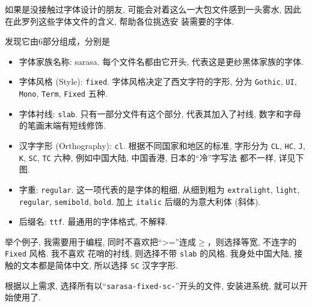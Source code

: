 \documentclass{article}
\begin{document}
如果是没接触过字体设计的朋友, 可能会对着这么一大包文件感到一头雾水, 因此在此罗列这些字体文件的含义, 帮助各位挑选安
装需要的字体.


发现它由6部分组成，分别是
\begin{itemize}
	\item 字体家族名称: sarasa. 每个文件名都由它开头, 代表这是更纱黑体家族的字体.
	\item 字体风格 (Style): \texttt{fixed}. 字体风格决定了西文字符的字形, 分为 \texttt{Gothic}, \texttt{UI}, 
	      \texttt{Mono}, \texttt{Term}, \texttt{Fixed} 五种.
	\item 字体衬线: \texttt{slab}. 只有一部分文件有这个部分, 代表其加入了衬线, 数字和字母的笔画末端有短线修饰.
	\item 汉字字形 (Orthography): \texttt{cl}. 根据不同国家和地区的标准, 字形分为 \texttt{CL}, \texttt{HC}, 
	      \texttt{J}, \texttt{K}, \texttt{SC}, \texttt{TC} 六种, 例如中国大陆, 中国香港, 日本的``冷''字写法
	      都不一样, 详见下图.
	\item 字重: \texttt{regular}. 这一项代表的是字体的粗细, 从细到粗为 \texttt{extralight}, \texttt{light}, 
	      \texttt{regular}, \texttt{semibold}, \texttt{bold}. 加上 \texttt{italic} 后缀的为意大利体 (斜体). 
	\item 后缀名: \texttt{ttf}. 最通用的字体格式, 不解释.
\end{itemize}

举个例子, 我需要用于编程, 同时不喜欢把``>=''连成$\geqslant$，则选择等宽, 不连字的 \texttt{Fixed} 风格. 我不喜欢
花哨的衬线, 则选择不带 \texttt{slab} 的风格. 我身处中国大陆, 接触的文本都是简体中文, 所以选择 \texttt{SC} 汉字字形.

根据以上需求, 选择所有以``\texttt{sarasa-fixed-sc-}''开头的文件, 安装进系统, 就可以开始使用了.
\end{document}
